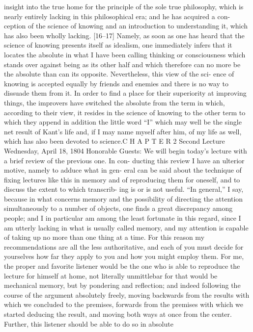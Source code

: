 insight into the true home for the principle of the sole true philosophy, which
is nearly entirely lacking in this philosophical era; and he has acquired a con-
ception of the science of knowing and an introduction to understanding it,
which has also been wholly lacking. [16–17] Namely, as soon as one has heard
that the science of knowing presents itself as idealism, one immediately infers
that it locates the absolute in what I have been calling thinking or consciousness
which stands over against being as its other half and which therefore can no
more be the absolute than can its opposite. Nevertheless, this view of the sci-
ence of knowing is accepted equally by friends and enemies and there is no
way to dissuade them from it.
In order to find a place for their superiority at improving things, the
improvers have switched the absolute from the term in which, according to
their view, it resides in the science of knowing to the other term to which they
append in addition the little word “I” which may well be the single net result
of Kant’s life and, if I may name myself after him, of my life as well, which has
also been devoted to science.C H A P T E R
2
Second Lecture
Wednesday, April 18, 1804
Honorable Guests:
We will begin today’s lecture with a brief review of the previous one. In con-
ducting this review I have an ulterior motive, namely to adduce what in gen-
eral can be said about the technique of fixing lectures like this in memory and
of reproducing them for oneself, and to discuss the extent to which transcrib-
ing is or is not useful. “In general,” I say, because in what concerns memory
and the possibility of directing the attention simultaneously to a number of
objects, one finds a great discrepancy among people; and I in particular am
among the least fortunate in this regard, since I am utterly lacking in what is
usually called memory, and my attention is capable of taking up no more than
one thing at a time. For this reason my recommendations are all the less
authoritative, and each of you must decide for yourselves how far they apply
to you and how you might employ them.
For me, the proper and favorite listener would be the one who is able to
reproduce the lecture for himself at home, not literally {unmittlebar} for that
would be mechanical memory, but by pondering and reflection; and indeed
following the course of the argument absolutely freely, moving backwards
from the results with which we concluded to the premises, forwards from the
premises with which we started deducing the result, and moving both ways at
once from the center. Further, this listener should be able to do so in absolute
